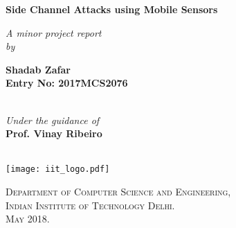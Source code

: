 \begin{titlepage}
\begin{center}

\LARGE{\textsf{\bfseries Side Channel Attacks using Mobile Sensors}}\\
\vspace{30pt}
\normalsize

\emph{A minor project report} \\

\vspace{30pt}
    \emph {by}\\
\vspace{30pt}

\Large{\textsf{\bfseries Shadab Zafar}} \\
{\normalsize \textsf{\bfseries Entry No: 2017MCS2076}}\\

\vspace{15pt}

\ \\
{\normalsize \emph {Under the guidance of}}
\ \\
\Large{\textsf{\bfseries Prof. Vinay Ribeiro}} \\
\ \\

\vspace{80pt}

\texttt{[image: iit\_logo.pdf]} \\
\vspace{10pt}

\large{\textsc{Department of Computer Science and Engineering,\\
Indian Institute of Technology Delhi.\\ May 2018.}}
\end{center}
\end{titlepage}
